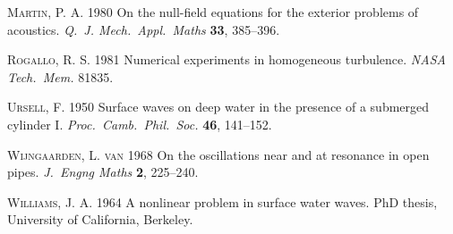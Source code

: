 \documentclass{jfm}
\begin{document}
\begin{thebibliography}{}
     \textsc{Martin, P. A.} 1980 {On the null-field equations for the exterior
     problems of acoustics.} \textit{Q.~J. Mech.\ Appl.\ Maths} \textbf{33},
     385--396.

     \textsc{Rogallo, R. S.} 1981 Numerical experiments in homogeneous
     turbulence. \textit{NASA Tech.\ Mem.} 81835.

     \textsc{Ursell, F.} 1950 Surface waves on deep water in the presence
     of a submerged cylinder I. \textit{Proc.\ Camb.\ Phil.\ Soc.} \textbf{46},
     141--152.

     \textsc{Wijngaarden, L. van} 1968 On the oscillations near and at
     resonance in open pipes. \textit{J.~Engng Maths} \textbf{2}, 225--240.

     \textsc{Williams, J. A.} 1964 A nonlinear problem in surface water waves.
     PhD thesis, University of California, Berkeley.

\end{thebibliography}
\end{document}
